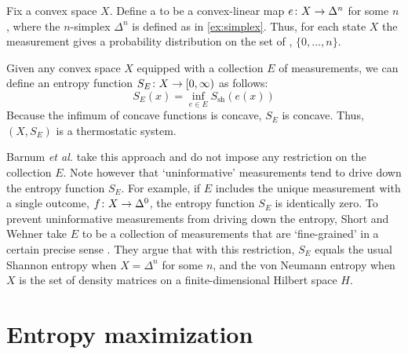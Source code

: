 \documentclass[12pt, reqno]{amsart}
\newcommand{\Ssh}{S_{\mathrm{sh}}} %
\begin{document}
\begin{example}
\label{ex:generalized}
    Fix a convex space $X$. Define a  to be a convex-linear map $e \colon X \rightarrow \Delta^n$ for some $n$, where the $n$-simplex $\Delta^n$ is defined as in \cref{ex:simplex}. Thus, for each state $X$ the measurement gives a probability distribution on the set of , $\{0, \dots, n\}$. 
    
    Given any convex space $X$ equipped with a collection $E$ of measurements, we can define an entropy function $S_E \colon X \rightarrow [0,\infty)$ as follows:
    \[    S_E(x) = \inf_{e \in E} \Ssh(e(x)) \]
    Because the infimum of concave functions is concave, $S_E$ is concave. Thus, $(X,S_E)$ is a thermostatic system.
    
    Barnum \textit{et al.} \cite{Barnum_et_al} take this approach and do not impose any restriction on the collection $E$. Note however that `uninformative' measurements tend to drive down the entropy function $S_E$. For example, if $E$ includes the unique measurement with a single outcome, $f \colon X \rightarrow \Delta^0$, the entropy function $S_E$ is identically zero. 
    To prevent uninformative measurements from driving down the entropy, Short and Wehner take $E$ to be a collection of measurements that are `fine-grained' in a certain precise sense \cite{ShortWehner}. They argue that with this restriction, $S_E$ equals the usual Shannon entropy when $X = \Delta^n$ for some $n$, and the von Neumann entropy when $X$ is the set of density matrices on a finite-dimensional Hilbert space $H$. 
\end{example}


\section{Entropy maximization}
\label{sec:entropy_maximization}
\end{document}
